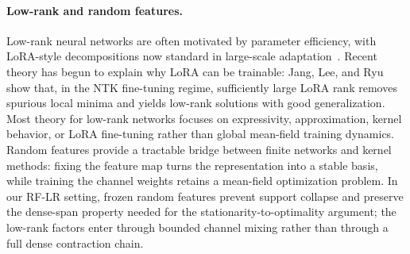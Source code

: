 \documentclass{article}
\begin{document}
\paragraph{Low-rank and random features.}
Low-rank neural networks are often motivated by parameter efficiency, with LoRA-style decompositions now standard in large-scale adaptation~\cite{hu2021}. Recent theory has begun to explain why LoRA can be trainable: Jang, Lee, and Ryu~\cite{jang2024lora} show that, in the NTK fine-tuning regime, sufficiently large LoRA rank removes spurious local minima and yields low-rank solutions with good generalization. Most theory for low-rank networks focuses on expressivity, approximation, kernel behavior, or LoRA fine-tuning rather than global mean-field training dynamics. Random features provide a tractable bridge between finite networks and kernel methods: fixing the feature map turns the representation into a stable basis, while training the channel weights retains a mean-field optimization problem. In our RF-LR setting, frozen random features prevent support collapse and preserve the dense-span property needed for the stationarity-to-optimality argument; the low-rank factors enter through bounded channel mixing rather than through a full dense contraction chain.
\end{document}

